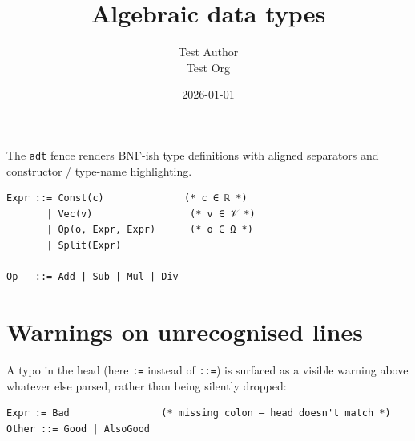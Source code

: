 \documentclass[11pt,a4paper]{article}
\title{Algebraic data types}
\author{Test Author \\ Test Org}
\date{2026-01-01}
\theoremstyle{definition}
\begin{document}
\maketitle

The \texttt{adt} fence renders BNF-ish type definitions with aligned
separators and constructor / type-name highlighting.


\begin{lstlisting}
Expr ::= Const(c)              (* c ∈ ℝ *)
       | Vec(v)                 (* v ∈ 𝒱 *)
       | Op(o, Expr, Expr)      (* o ∈ Ω *)
       | Split(Expr)

Op   ::= Add | Sub | Mul | Div
\end{lstlisting}


\section{Warnings on unrecognised lines}

A typo in the head (here \texttt{:=} instead of \texttt{::=}) is surfaced as a
visible warning above whatever else parsed, rather than being
silently dropped:


\begin{lstlisting}
Expr := Bad                (* missing colon — head doesn't match *)
Other ::= Good | AlsoGood
\end{lstlisting}
\end{document}
